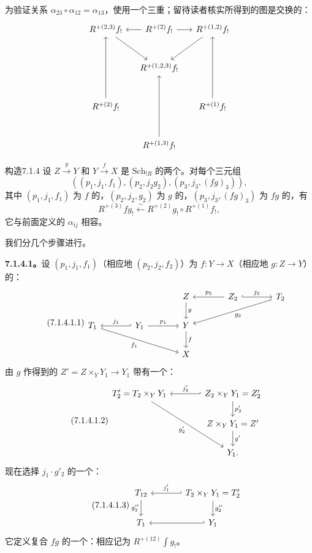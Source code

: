 为验证关系 $\alpha_{23}\circ\alpha_{12}=\alpha_{13}$，使用一个三重；留待读者核实所得到的图是交换的：
\[
\begin{tikzcd}[column sep=small,row sep=large]
R^{+(2,3)}f_!\arrow[dr]&R^{+(2)}f_!\arrow[l]\arrow[r]&R^{+(1,2)}f_!\arrow[dl]\\
&R^{+(1,2,3)}f_!&\\
R^{+(2)}f_!\arrow[uu]&&R^{+(1)}f_!\arrow[uu]\\
&R^{+(1,3)}f_!\arrow[uu]&
\end{tikzcd}
\]

\begin{SGAresult}{构造}{7.1.4}
设 $Z\xrightarrow gY$ 和 $Y\xrightarrow fX$ 是 $\mathrm{Sch}_{!R}$ 的两个。对每个三元组
\[((p_1,j_1,f_1),(p_2,j_2g_2),(p_3,j_3,(fg)_3)),\]
其中 $(p_1,j_1,f_1)$ 为 $f$ 的，$(p_2,j_2,g_2)$ 为 $g$ 的，$(p_3,j_3,(fg)_3)$ 为 $fg$ 的，有
\[R^{+(3)}fg_!\xleftarrow\sim R^{+(2)}g_!\circ R^{+(1)}f_!,\]
它与前面定义的 $\alpha_{ij}$ 相容。
\end{SGAresult}
我们分几个步骤进行。

\textbf{7.1.4.1。}设 $(p_1,j_1,f_1)$（相应地 $(p_2,j_2,f_2)$）为 $f:Y\to X$（相应地 $g:Z\to Y$）的：
\begin{equation}\tag{7.1.4.1.1}
\begin{tikzcd}[column sep=large]
&&Z\arrow[d,"g"]&Z_2\arrow[l,"p_2"']\arrow[r,hook,"j_2"]&T_2\arrow[dll,"g_2"]\\
T_1\arrow[drr,"f_1"']&Y_1\arrow[l,hook',"j_1"']\arrow[r,"p_1"]&Y\arrow[d,"f"]&&\\
&&X&&
\end{tikzcd}
\end{equation}
由 $g$ 作得到的 $Z'=Z\times_Y Y_1\to Y_1$ 带有一个：
\begin{equation}\tag{7.1.4.1.2}
\begin{tikzcd}[column sep=large]
T'_2=T_2\times_Y Y_1\arrow[ddr,"g'_2"']&Z_2\times_Y Y_1=Z'_2\arrow[l,hook',"j'_2"']\arrow[d,"p'_2"]\\
&Z\times_Y Y_1=Z'\arrow[d,"g'"]\\
&Y_1.
\end{tikzcd}
\end{equation}
现在选择 $j_1\cdot g'_2$ 的一个：
\begin{equation}\tag{7.1.4.1.3}
\begin{tikzcd}[column sep=large]
T_{12}\arrow[d,"g''_2"']&T_2\times_Y Y_1=T'_2\arrow[l,hook',"j'_1"']\arrow[d,"g''_2"]\\
T_1&Y_1\arrow[l,hook']
\end{tikzcd}
\end{equation}
它定义复合 $fg$ 的一个：相应记为 $R^{+(12)}\int g_!$。

